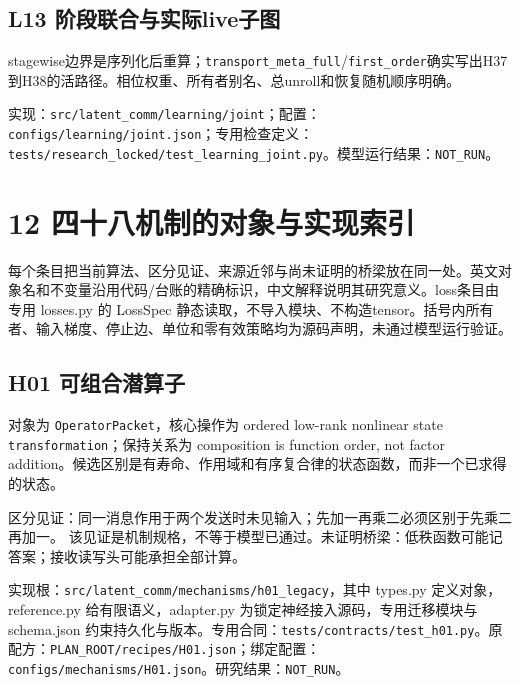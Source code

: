 \documentclass[
  10pt,
]{article}
\begin{document}
\subsection{L13
阶段联合与实际live子图}\label{l13-ux9636ux6bb5ux8054ux5408ux4e0eux5b9eux9645liveux5b50ux56fe}

stagewise边界是序列化后重算；\nolinkurl{transport_meta_full}/\nolinkurl{first_order}确实写出H37到H38的活路径。相位权重、所有者别名、总unroll和恢复随机顺序明确。

实现：{\small\nolinkurl{src/latent_comm/learning/joint}}；配置：{\small\nolinkurl{configs/learning/joint.json}}；专用检查定义：{\small\nolinkurl{tests/research_locked/test_learning_joint.py}}。模型运行结果：\nolinkurl{NOT_RUN}。

\section{12
四十八机制的对象与实现索引}\label{ux56dbux5341ux516bux673aux5236ux7684ux5bf9ux8c61ux4e0eux5b9eux73b0ux7d22ux5f15}

每个条目把当前算法、区分见证、来源近邻与尚未证明的桥梁放在同一处。英文对象名和不变量沿用代码/台账的精确标识，中文解释说明其研究意义。loss条目由专用
losses.py 的 LossSpec
静态读取，不导入模块、不构造tensor。括号内所有者、输入梯度、停止边、单位和零有效策略均为源码声明，未通过模型运行验证。

\subsection{H01
可组合潜算子}\label{h01-ux53efux7ec4ux5408ux6f5cux7b97ux5b50}

对象为 \nolinkurl{OperatorPacket}，核心操作为 ordered low-rank nonlinear
state \nolinkurl{transformation}；保持关系为 composition is function
order, not factor
addition。候选区别是有寿命、作用域和有序复合律的状态函数，而非一个已求得的状态。

区分见证：同一消息作用于两个发送时未见输入；先加一再乘二必须区别于先乘二再加一。
该见证是机制规格，不等于模型已通过。未证明桥梁：低秩函数可能记答案；接收读写头可能承担全部计算。

实现根：{\small\nolinkurl{src/latent_comm/mechanisms/h01_legacy}}，其中
types.py 定义对象，reference.py 给有限语义，adapter.py
为锁定神经接入源码，专用迁移模块与 schema.json
约束持久化与版本。专用合同：{\small\nolinkurl{tests/contracts/test_h01.py}}。原配方：{\small\nolinkurl{PLAN_ROOT/recipes/H01.json}}；绑定配置：{\small\nolinkurl{configs/mechanisms/H01.json}}。研究结果：\nolinkurl{NOT_RUN}。
\end{document}
